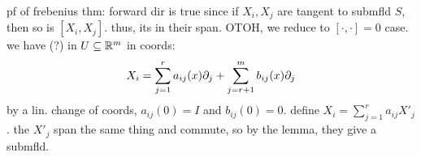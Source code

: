 pf of frebenius thm: forward dir is true since if $X_{i},X_{j}$ are
tangent to submfld $S$, then so is $[X_{i},X_{j}]$.
thus, its in their span.
OTOH, we reduce to $[\cdot,\cdot]=0$ case.
we have (?) in $U\subseteq\mathbb{R}^{m}$ in coords:
\begin{equation*}
	X_{i}=\sum_{j=1}^{r}a_{ij}(x)\partial_{j}+\sum_{j=r+1}^{m}b_{ij}(x)\partial_{j}
\end{equation*}
by a lin. change of coords, $a_{ij}(0)=I$ and $b_{ij}(0)=0$.
define $X_{i}=\sum_{j=1}^{r}a_{ij}X'_{j}$.
the $X'_{j}$ span the same thing and commute, so by the lemma,
they give a submfld.

